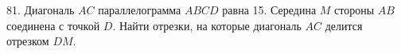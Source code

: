 81. Диагональ $AC$ параллелограмма $ABCD$ равна 15. Середина $M$ стороны $AB$ соединена с точкой $D.$ Найти отрезки, на которые диагональ $AC$ делится отрезком $DM.$\\
